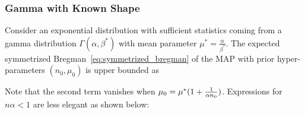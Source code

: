 \begin{subappendices}
\subsubsection{Gamma with Known Shape}
\label{app:proof-MAP-gamma}

\begin{theorem}
Consider an exponential distribution with sufficient statistics coming from a gamma distribution $\Gamma(\alpha, \beta^*)$ with mean parameter $\mu^* = \frac{\alpha}{\beta^*}$.
The expected symmetrized Bregman~\eqref{eq:symmetrized_bregman} of the MAP  with prior hyper-parameters $(n_0,\mu_0)$ is upper bounded as
\end{theorem} 
Note that the second term vanishes when $\mu_0 = \mu^* (1 + \frac{1}{\alpha n_0})$.
Expressions for $n\alpha < 1$ are less elegant as shown below:


\end{subappendices}

